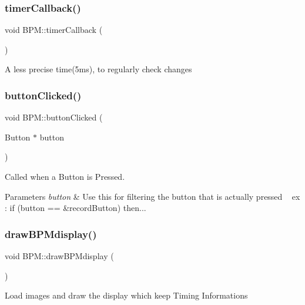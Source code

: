 \subsubsection{\texorpdfstring{timerCallback()}{timerCallback()}}
{\footnotesize\ttfamily void B\+P\+M\+::timer\+Callback (\begin{DoxyParamCaption}{ }\end{DoxyParamCaption})\hspace{0.3cm}{\ttfamily [override]}}

A less precise time(5ms), to regularly check changes \mbox{\label{class_b_p_m_a25860f85e579f4d7361f573ddd643146}} 
\subsubsection{\texorpdfstring{buttonClicked()}{buttonClicked()}}
{\footnotesize\ttfamily void B\+P\+M\+::button\+Clicked (\begin{DoxyParamCaption}\item[{Button $\ast$}]{button }\end{DoxyParamCaption})\hspace{0.3cm}{\ttfamily [override]}}

Called when a Button is Pressed. 
\begin{DoxyParams}{Parameters}
{\em button} & Use this for filtering the button that is actually pressed ~\newline
 ex \+: if (button == \&record\+Button) then... \\
\hline
\end{DoxyParams}
\mbox{\label{class_b_p_m_a39680ea9e81f2e18b1e391b3c3b75eb9}} 
\subsubsection{\texorpdfstring{drawBPMdisplay()}{drawBPMdisplay()}}
{\footnotesize\ttfamily void B\+P\+M\+::draw\+B\+P\+Mdisplay (\begin{DoxyParamCaption}{ }\end{DoxyParamCaption})}

Load images and draw the display which keep Timing Informations \mbox{\label{class_b_p_m_a9ece3eda2583b29c57ba605bcfd54889}} 
